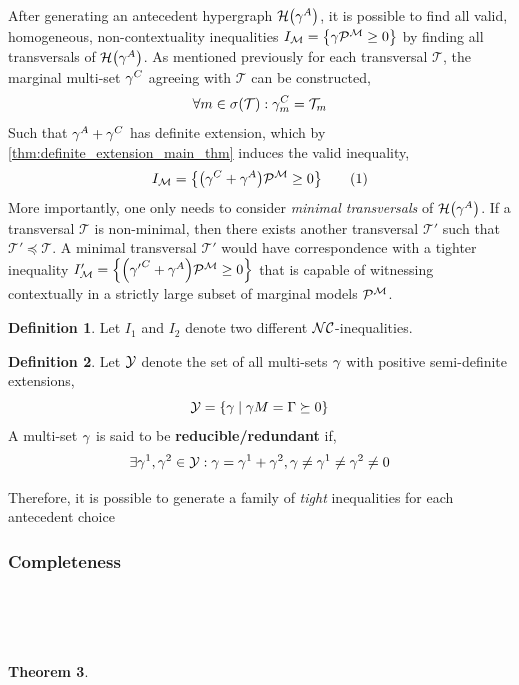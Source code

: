 \documentclass[aps, 10pt, english, twoside, pra, nofootinbib, longbibliography]{revtex4-1}
\theoremstyle{plain}
\newtheorem{theorem}{Theorem}
\theoremstyle{definition}
\newtheorem{definition}[theorem]{Definition}
\theoremstyle{remark}
\newcommand{\hgraph}{\mathcal{H}}
\newcommand{\trans}{\mathcal{T}}
\newcommand{\mscenario}{\mathcal{M}}
\newcommand{\supp}[1]{\si\br{#1}}
\newcommand{\term}[1]{\textcolor{Mahogany}{\textbf{#1}}}
\newcommand{\tcdot}{} %
\begin{document}
    After generating an antecedent hypergraph $\hgraph\br{\ga^A}$, it is possible to find all valid, homogeneous, non-contextuality inequalities $I_\mscenario = \bc{ \ga \tcdot \probvec^{\mscenario} \geq 0}$ by finding all transversals of $\hgraph\br{\ga^A}$. As mentioned previously for each transversal $\trans$, the marginal multi-set $\gamma^C$ agreeing with $\trans$ can be constructed,
    \[ \forall m \in \supp{\trans} : \ga^C_{m} = \trans_m \]
    Such that $\gamma^A + \gamma^C$ has definite extension, which by \cref{thm:definite_extension_main_thm} induces the valid inequality,
    \[ I_\mscenario = \bc{\br{\ga^C + \ga^A} \tcdot \probvec^{\mscenario} \geq 0} \eq \label{eq:transversal_inequality}\]
    More importantly, one only needs to consider \textit{minimal transversals} of $\hgraph\br{\ga^A}$. If a transversal $\trans$ is non-minimal, then there exists another transversal $\trans'$ such that $\trans' \preceq \trans$. A minimal transversal $\trans'$ would have correspondence with a tighter inequality $I_\mscenario' = \bc{\br{{\ga'}^C + \ga^A} \tcdot \probvec^{\mscenario} \geq 0}$ that is capable of witnessing contextually in a strictly large subset of marginal models $\probvec^{\mscenario}$. \\

    \begin{definition}
        Let $I_1$ and $I_2$ denote two different $\mathcal{NC}$-inequalities.
    \end{definition}

    \begin{definition}
        Let $\mathcal{Y}$ denote the set of all multi-sets $\gamma$ with positive semi-definite extensions,
        \[ \s{Y} = \bc{\ga \mid \ga \tcdot M = \Ga \succeq 0} \]
        A multi-set $\gamma$ is said to be \term{reducible/redundant} if,
        \[ \exists \gamma^1, \gamma^2 \in \mathcal{Y} : \gamma = \gamma^1 + \gamma^2, \gamma \neq \gamma^1 \neq \gamma^2 \neq 0 \]
    \end{definition}


    Therefore, it is possible to generate a family of \textit{tight} inequalities for each antecedent choice

    \subsubsection{Completeness}
    \label{sec:completeness_dep}
     \\
     \\
     \\
    \begin{theorem}
        \label{thm:completeness}
    \end{theorem}
\end{document}
